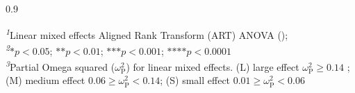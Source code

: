 \begin{xltabular}{0.9\textwidth}

\bottomrule
\end{xltabular}

\noindent
\begin{minipage}{1\textwidth}
\textsuperscript{\textit{1}}Linear mixed effects Aligned Rank Transform (ART) ANOVA (\lmeart); \\
\textsuperscript{\textit{2}}$\text{*}p<0.05$; $\text{**}p<0.01$; $\text{***}p<0.001$; $\text{****}p<0.0001$\\
\textsuperscript{\textit{3}}Partial Omega squared ($\omega^2_\text{P}$) for linear mixed effects. (L) large effect $\omega^2_\text{P}\ge0.14$ ; (M) medium effect $0.06\ge\omega^2_\text{P}<0.14$; (S) small effect $0.01\ge\omega^2_\text{P}<0.06$ \\
\end{minipage}



